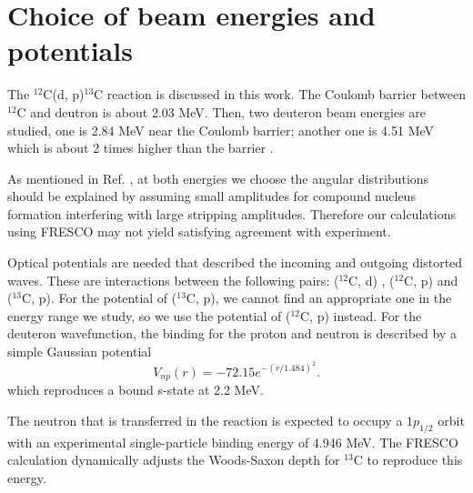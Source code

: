 \section{Choice of beam energies and potentials} \label{part1}
	The $^{12}$C(d, p)$^{13}$C reaction is discussed in this work. 
	The Coulomb barrier between $^{12}$C and deutron is about 2.03 MeV.
	Then, two deuteron beam energies are studied, one is 2.84 MeV near the Coulomb barrier; another one is 4.51 MeV which is about 2 times higher than the barrier .
	
	As mentioned in Ref. \cite{PhysRev.101.209}, at both energies we choose the angular distributions should be explained by assuming small amplitudes for compound nucleus formation interfering with large stripping amplitudes. 
	Therefore our calculations using FRESCO may not yield satisfying agreement with experiment.
	
	Optical potentials are needed that described the incoming and outgoing distorted waves.  
	These are interactions between the following pairs: ($^{12}$C, d) \cite{PhysRevC.73.054605}, ($^{12}$C, p) \cite{PTCOG} and ($^{13}$C, p). 
	For the potential of ($^{13}$C, p), we cannot find an appropriate one in the energy range we study, 
	so we use the potential of ($^{12}$C, p) instead. 
	For the deuteron wavefunction, the binding for the proton and neutron is described by a simple Gaussian potential 
	\begin{equation}
		V_{np}(r)=-72.15e^{-(r/1.484)^2}.
	\end{equation}
	which reproduces a bound s-state at 2.2 MeV.
	
	The neutron that is transferred in the reaction is expected to occupy a $1p_{1/2}$ orbit with an experimental single-particle binding energy of 4.946 MeV. 
	The FRESCO calculation dynamically adjusts the Woods-Saxon depth for $^{13}$C to reproduce this energy.
	
	